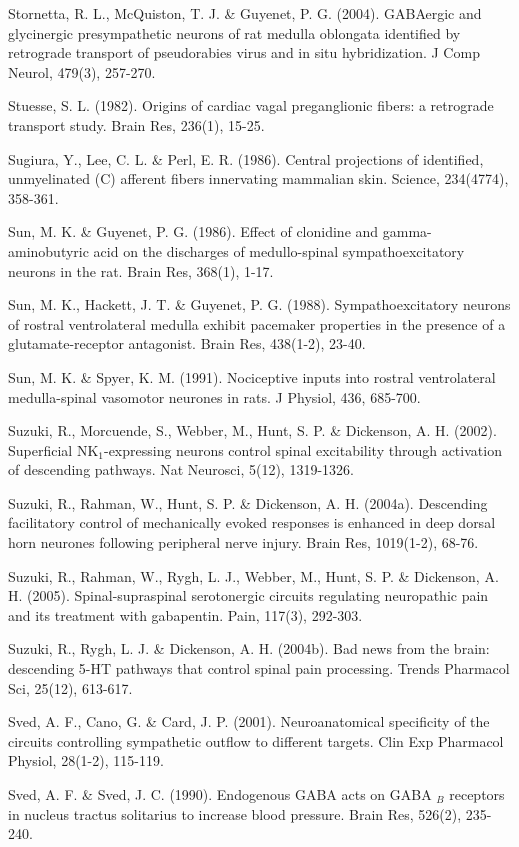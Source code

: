 \documentclass[a4paper,12pt,twoside]{report}
\begin{document}
\begin{singlespacing}
\begin{footnotesize}
Stornetta, R. L., McQuiston, T. J. \& Guyenet, P. G. (2004). GABAergic and glycinergic presympathetic neurons of rat medulla oblongata identified by retrograde transport of pseudorabies virus and in situ hybridization. J Comp Neurol, 479(3), 257-270.

Stuesse, S. L. (1982). Origins of cardiac vagal preganglionic fibers: a retrograde transport study. Brain Res, 236(1), 15-25.

Sugiura, Y., Lee, C. L. \& Perl, E. R. (1986). Central projections of identified, unmyelinated (C) afferent fibers innervating mammalian skin. Science, 234(4774), 358-361.

Sun, M. K. \& Guyenet, P. G. (1986). Effect of clonidine and gamma-aminobutyric acid on the discharges of medullo-spinal sympathoexcitatory neurons in the rat. Brain Res, 368(1), 1-17.

Sun, M. K., Hackett, J. T. \& Guyenet, P. G. (1988). Sympathoexcitatory neurons of rostral ventrolateral medulla exhibit pacemaker properties in the presence of a glutamate-receptor antagonist. Brain Res, 438(1-2), 23-40.

Sun, M. K. \& Spyer, K. M. (1991). Nociceptive inputs into rostral ventrolateral medulla-spinal vasomotor neurones in rats. J Physiol, 436, 685-700.

Suzuki, R., Morcuende, S., Webber, M., Hunt, S. P. \& Dickenson, A. H. (2002). Superficial NK$_{1}$-expressing neurons control spinal excitability through activation of descending pathways. Nat Neurosci, 5(12), 1319-1326.

Suzuki, R., Rahman, W., Hunt, S. P. \& Dickenson, A. H. (2004a). Descending facilitatory control of mechanically evoked responses is enhanced in deep dorsal horn neurones following peripheral nerve injury. Brain Res, 1019(1-2), 68-76.

Suzuki, R., Rahman, W., Rygh, L. J., Webber, M., Hunt, S. P. \& Dickenson, A. H. (2005). Spinal-supraspinal serotonergic circuits regulating neuropathic pain and its treatment with gabapentin. Pain, 117(3), 292-303.

Suzuki, R., Rygh, L. J. \& Dickenson, A. H. (2004b). Bad news from the brain: descending 5-HT pathways that control spinal pain processing. Trends Pharmacol Sci, 25(12), 613-617.

Sved, A. F., Cano, G. \& Card, J. P. (2001). Neuroanatomical specificity of the circuits controlling sympathetic outflow to different targets. Clin Exp Pharmacol Physiol, 28(1-2), 115-119.

Sved, A. F. \& Sved, J. C. (1990). Endogenous GABA acts on GABA $_{B}$ receptors in nucleus tractus solitarius to increase blood pressure. Brain Res, 526(2), 235-240.


\end{footnotesize}
\end{singlespacing}
\end{document}
